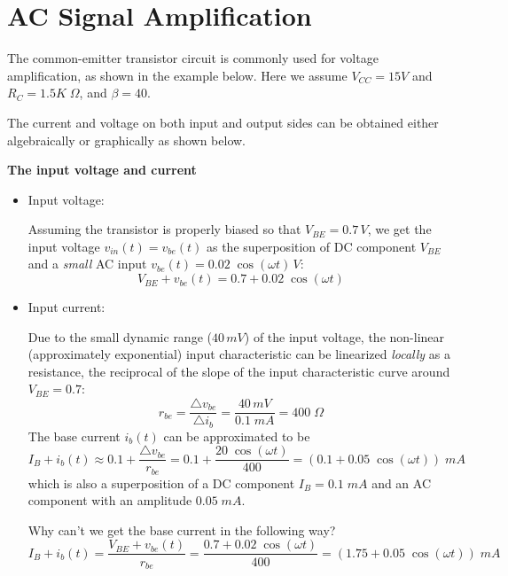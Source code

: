 \documentclass{article}
\begin{document}



\section*{AC Signal Amplification}

The common-emitter transistor circuit is commonly used for voltage
amplification, as shown in the example below. Here we assume $V_{CC}=15V$
and $R_C=1.5K\;\Omega$, and $\beta=40$. 


The current and voltage on both input and output sides can be 
obtained either algebraically or graphically as shown below.

{\bf The input voltage and current}

\begin{itemize}



\item Input voltage:

  Assuming the transistor is properly biased so that $V_{BE}=0.7\,V$, 
  we get the input voltage $v_{in}(t)=v_{be}(t)$ as the superposition 
  of DC component $V_{BE}$ and a {\em small}  AC input 
  $v_{be}(t)=0.02\;\cos(\omega t)\,V$:
  \begin{equation}
  V_{BE}+v_{be}(t)=0.7+0.02\;\cos(\omega t)
  \end{equation}
\item Input current:
  
  Due to the small dynamic range ($40\,mV$) of the input voltage, the 
  non-linear (approximately exponential) input characteristic can be 
  linearized {\em locally} as a resistance, the reciprocal of the 
  slope of the input characteristic curve around $V_{BE}=0.7$:
  \begin{equation}
  r_{be}=\frac{\triangle v_{be}}{\triangle i_b}=\frac{40\,mV}{0.1\;mA}=400 \;\Omega
  \end{equation}
  The base current $i_b(t)$ can be approximated to be 
  \begin{equation} 
  I_B+i_b(t) \approx 0.1+\frac{\triangle v_{be}}{r_{be}}
  =0.1+\frac{20\;\cos(\omega t)}{400}
  =(0.1+0.05\;\cos(\omega t))\;mA 
  \end{equation}
  which is also a superposition of a DC component $I_B=0.1\;mA$ and 
  an AC component with an amplitude $0.05\;mA$. 

  Why can't we get the base current in the following way?
  \begin{equation}
  I_B+i_b(t) =\frac{V_{BE}+v_{be}(t)}{r_{be}}
  =\frac{0.7+0.02\;\cos(\omega t)}{400}
  =(1.75+0.05\;\cos(\omega t))\;mA 
  \end{equation}

\end{itemize}
\end{document}
